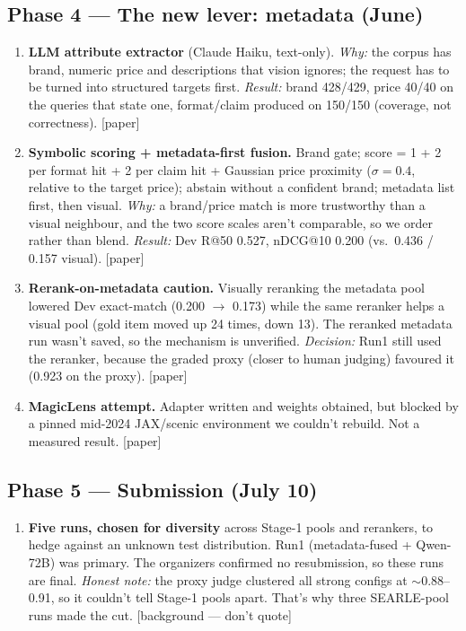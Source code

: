 \documentclass[11pt]{article}
\newcommand{\inpaper}{\textcolor{accent}{\small[paper]}}
\newcommand{\bg}{\textcolor{black!55}{\small[background --- don't quote]}}
\begin{document}
\subsection*{Phase 4 --- The new lever: metadata (June)}
\begin{enumerate}[resume,leftmargin=*]
  \item \textbf{LLM attribute extractor} (Claude Haiku, text-only). \emph{Why:} the corpus
        has brand, numeric price and descriptions that vision ignores; the request has to be
        turned into structured targets first. \emph{Result:} brand 428/429, price 40/40 on
        the queries that state one, format/claim produced on 150/150 (coverage, not
        correctness). \inpaper
  \item \textbf{Symbolic scoring + metadata-first fusion.} Brand gate; score = 1 + 2 per
        format hit + 2 per claim hit + Gaussian price proximity ($\sigma{=}0.4$, relative to
        the target price); abstain without a confident brand; metadata list first, then
        visual. \emph{Why:} a brand/price match is more trustworthy than a visual neighbour,
        and the two score scales aren't comparable, so we order rather than blend.
        \emph{Result:} Dev R@50 0.527, nDCG@10 0.200 (vs.\ 0.436 / 0.157 visual). \inpaper
  \item \textbf{Rerank-on-metadata caution.} Visually reranking the metadata pool lowered Dev
        exact-match (0.200 $\to$ 0.173) while the same reranker helps a visual pool (gold
        item moved up 24 times, down 13). The reranked metadata run wasn't saved, so the
        mechanism is unverified. \emph{Decision:} Run1 still used the reranker, because the
        graded proxy (closer to human judging) favoured it (0.923 on the proxy). \inpaper
  \item \textbf{MagicLens attempt.} Adapter written and weights obtained, but blocked by a
        pinned mid-2024 JAX/scenic environment we couldn't rebuild. Not a measured result.
        \inpaper
\end{enumerate}

\subsection*{Phase 5 --- Submission (July 10)}
\begin{enumerate}[resume,leftmargin=*]
  \item \textbf{Five runs, chosen for diversity} across Stage-1 pools and rerankers, to hedge
        against an unknown test distribution. Run1 (metadata-fused + Qwen-72B) was primary.
        The organizers confirmed no resubmission, so these runs are final. \emph{Honest
        note:} the proxy judge clustered all strong configs at $\sim$0.88--0.91, so it
        couldn't tell Stage-1 pools apart. That's why three SEARLE-pool runs made the
        cut. \bg
\end{enumerate}
\end{document}
